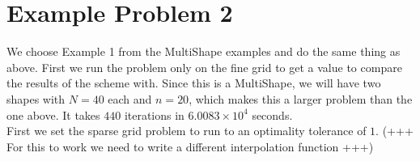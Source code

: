 \documentclass[11pt, a4paper]{article}
\theoremstyle{definition}
\begin{document}
\section{Example Problem 2}
We choose Example 1 from the MultiShape examples and do the same thing as above. 
First we run the problem only on the fine grid to get a value to compare the results of the scheme with. Since this is a MultiShape, we will have two shapes with $N = 40$ each and $n = 20$, which makes this a larger problem than the one above. It takes $440$ iterations in $6.0083 \times 10^4$ seconds.\\
First we set the sparse grid problem to run to an optimality tolerance of $1$.
(+++ For this to work we need to write a different interpolation function +++)	
	
	
	
	
\end{document}
